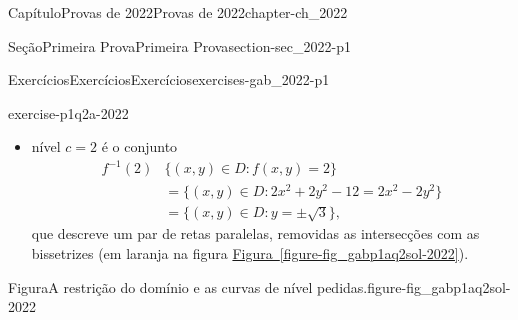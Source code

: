\documentclass[oneside,10pt,]{book}
\newcommand{\xreffont}{\relax}
\numberwithin{equation}{section}
\begin{document}
\begin{chapterptx}{Capítulo}{Provas de 2022}{}{Provas de 2022}{}{}{chapter-ch_2022}
\begin{sectionptx}{Seção}{Primeira Prova}{}{Primeira Prova}{}{}{section-sec_2022-p1}
\begin{exercises-subsection-numberless}{Exercícios}{Exercícios}{}{Exercícios}{}{}{exercises-gab_2022-p1}
\begin{divisionexercise}{2}{}{}{exercise-p1q2a-2022}
\begin{enumerate}[label=\alph*]
\begin{itemize}[label=\textbullet]
\begin{align*}
f^{-1}(1)&=\big\{(x,y)\in D\colon
f(x,y)=1\big\}\\
&= \big\{(x,y)\in D\colon
2x^2+2y^2-12=x^2-y^2\big\}\\
&= \Big\{(x,y)\in D\colon
\Big(\frac{x}{2\sqrt{3}}\Big)^2
+\Big(\frac{y}{2}\Big)^2=1\Big\},
\end{align*}
tratando-se da interseção de uma elipse com o domínio de \(f\), esboçada em azul na \hyperref[figure-fig_gabp1aq2sol-2022]{Figura~{\xreffont\ref{figure-fig_gabp1aq2sol-2022}}}.%
\item{}nível \(c=2\) é o conjunto%
\begin{align*}
f^{-1}(2)&\big\{(x,y)\in D\colon
f(x,y)=2\big\}\\
&=\big\{(x,y)\in D\colon
2x^2+2y^2-12=2x^2-2y^2\big\}\\
&=\big\{(x,y)\in D\colon y=\pm\sqrt{3}\big\},
\end{align*}
que descreve um par de retas paralelas, removidas as intersecções com as bissetrizes (em laranja na figura \hyperref[figure-fig_gabp1aq2sol-2022]{Figura~{\xreffont\ref{figure-fig_gabp1aq2sol-2022}}}).%
\end{itemize}
%
\par
\begin{figureptx}{Figura}{A restrição do domínio e as curvas de nível pedidas.}{figure-fig_gabp1aq2sol-2022}{}%
\begin{image}{0}{1}{0}{}%
%
\end{image}%
\tcblower
\end{figureptx}%
%

\end{enumerate}
\end{divisionexercise}
\end{exercises-subsection-numberless}
\end{sectionptx}
\end{chapterptx}
\end{document}
